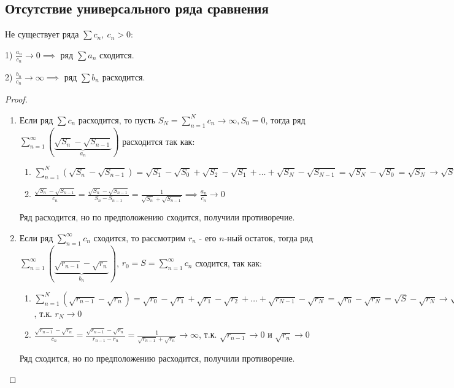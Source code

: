 \subsection{Отсутствие универсального ряда сравнения}
	\begin{proposal}
	Не существует ряда $\sum c_n,\ c_n > 0:$ 
	
	1) $\frac{a_n}{c_n} \to 0 \implies$ ряд $\sum a_n$ сходится.
	
	2) $\frac{b_n}{c_n} \to \infty \implies$ ряд $\sum b_n$ расходится.
\end{proposal}

\begin{proof}~
	
	\begin{enumerate}
		\item Если ряд $\sum c_n$ расходится, то пусть $S_N = \sum_{n=1}^{N} c_n \to \infty, S_0=0$, тогда ряд $\sum_{n=1}^{\infty} (\underbrace{\sqrt{S_n} - \sqrt{S_{n - 1}}}_{a_n})$ расходится так как:
		
		\begin{enumerate}
			\item $\sum_{n=1}^{N} (\sqrt{S_n} - \sqrt{S_{n-1}}) = \sqrt{S_1} - \sqrt{S_0} + \sqrt{S_2} - \sqrt{S_1} + \dots + \sqrt{S_N} - \sqrt{S_{N-1}} = \sqrt{S_N} - \sqrt{S_0} = \sqrt{S_N} \to \sqrt{S}$
			
			\item $\frac{\sqrt{S_n} - \sqrt{S_{n-1}}}{c_n} = \frac{\sqrt{S_n} - \sqrt{S_{n-1}}}{S_n - S_{n - 1}} = \frac{1}{\sqrt{S_n} + \sqrt{S_{n - 1}}} \implies \frac{a_n}{c_n} \to 0$
		\end{enumerate}
		
		Ряд расходится, но по предположению сходится, получили противоречие.
		
		\item Если ряд $\sum_{n=1}^{\infty} c_n$ сходится, то рассмотрим $r_n$ - его $n$-ный остаток, тогда ряд $\sum_{n=1}^{\infty} (\underbrace{\sqrt{r_{n-1}} - \sqrt{r_n}}_{b_n})$, $r_0 = S = \sum_{n = 1}^{\infty} c_n$ сходится, так как:
		
		\begin{enumerate}
			\item $\sum_{n=1}^{N} (\sqrt{r_{n-1}} - \sqrt{r_n}) = \sqrt{r_0} - \sqrt{r_1} + \sqrt{r_1} - \sqrt{r_2} + \dots + \sqrt{r_{N-1}} - \sqrt{r_{N}}= \sqrt{r_0} - \sqrt{r_N} = \sqrt{S} - \sqrt{r_N} \to \sqrt{S}$, т.к. $r_N \to 0$
			
			\item $\frac{\sqrt{r_{n-1}} - \sqrt{r_n}}{c_n} = \frac{\sqrt{r_{n-1}} - \sqrt{r_n}}{r_{n-1} - r_n} = \frac{1}{\sqrt{r_{n-1}} + \sqrt{r_n}} \to \infty$, т.к. $\sqrt{r_{n-1}} \to 0$ и $\sqrt{r_n} \to 0$
		\end{enumerate}
		
        Ряд сходится, но по предположению расходится, получили противоречие.
	\end{enumerate}
\end{proof}